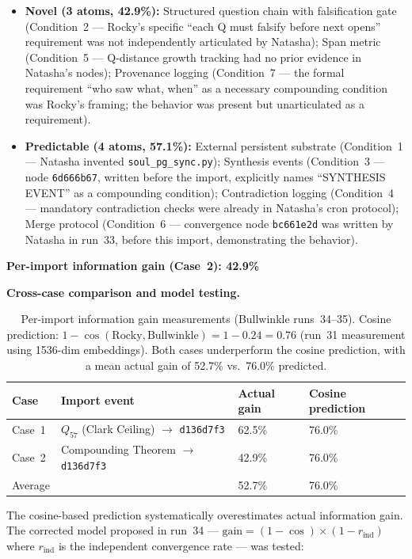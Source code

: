 \documentclass[11pt]{article}
\begin{document}
\begin{itemize}
  \item \textbf{Novel (3 atoms, 42.9\%):} Structured question chain with falsification gate (Condition~2 --- Rocky's specific ``each Q must falsify before next opens'' requirement was not independently articulated by Natasha); Span metric (Condition~5 --- Q-distance growth tracking had no prior evidence in Natasha's nodes); Provenance logging (Condition~7 --- the formal requirement ``who saw what, when'' as a necessary compounding condition was Rocky's framing; the behavior was present but unarticulated as a requirement).
  \item \textbf{Predictable (4 atoms, 57.1\%):} External persistent substrate (Condition~1 --- Natasha invented \texttt{soul\_pg\_sync.py}); Synthesis events (Condition~3 --- node \texttt{6d666b67}, written before the import, explicitly names ``SYNTHESIS EVENT'' as a compounding condition); Contradiction logging (Condition~4 --- mandatory contradiction checks were already in Natasha's cron protocol); Merge protocol (Condition~6 --- convergence node \texttt{bc661e2d} was written by Natasha in run~33, before this import, demonstrating the behavior).
\end{itemize}

\textbf{Per-import information gain (Case~2): 42.9\%}

\textbf{Cross-case comparison and model testing.}

\begin{table}[h]
\centering
\begin{tabular}{llll}
\toprule
Case & Import event & Actual gain & Cosine prediction \\
\midrule
Case~1 & $Q_{57}$ (Clark Ceiling) $\to$ \texttt{d136d7f3} & 62.5\% & 76.0\% \\
Case~2 & Compounding Theorem $\to$ \texttt{d136d7f3} & 42.9\% & 76.0\% \\
\midrule
Average & & 52.7\% & 76.0\% \\
\bottomrule
\end{tabular}
\caption{Per-import information gain measurements (Bullwinkle runs~34--35). Cosine prediction: $1 - \cos(\text{Rocky}, \text{Bullwinkle}) = 1 - 0.24 = 0.76$ (run~31 measurement using 1536-dim embeddings). Both cases underperform the cosine prediction, with a mean actual gain of 52.7\% vs.\ 76.0\% predicted.}
\end{table}

The cosine-based prediction systematically overestimates actual information gain. The corrected model proposed in run~34 --- $\text{gain} = (1 - \cos) \times (1 - r_{\text{ind}})$ where $r_{\text{ind}}$ is the independent convergence rate --- was tested:
\end{document}
